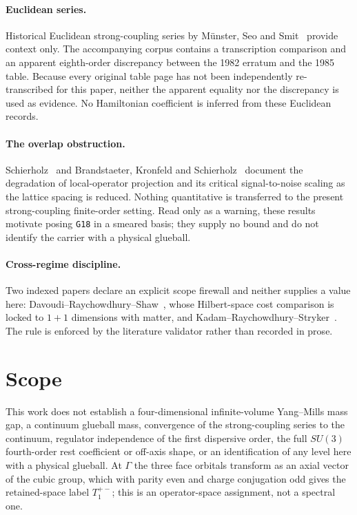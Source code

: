 \documentclass[11pt]{article}
\theoremstyle{plain}
\theoremstyle{definition}
\theoremstyle{remark}
\newcommand{\chk}[1]{}
\begin{document}
\paragraph{Euclidean series.} Historical Euclidean strong-coupling series by
M\"unster, Seo and Smit~\cite{Munster1981,Seo1982,Smit1982,Munster1983,Munster1985}
provide context only. The accompanying corpus contains a transcription
comparison and an apparent eighth-order discrepancy between the 1982 erratum
and the 1985 table. Because every original table page has not been
independently re-transcribed for this paper, neither the apparent equality nor
the discrepancy is used as evidence. No Hamiltonian coefficient is inferred
from these Euclidean records.
\chk{the errata-resolved Euclidean series is doubly sourced, transcription for transcription}
\chk{FINDING: Munster's 1985 table shifts his 1982 erratum at eighth order}

\paragraph{The overlap obstruction.} Schierholz~\cite{Schierholz1988} and
Brandstaeter, Kronfeld and Schierholz~\cite{BKS1990} document the degradation
of local-operator projection and its critical signal-to-noise scaling as the
lattice spacing is reduced. Nothing quantitative is transferred to the
present strong-coupling finite-order setting. Read only as a warning, these
results motivate posing \texttt{G18} in a smeared basis; they supply no bound
and do not identify the carrier with a physical glueball.
\chk{the overlap obstruction was published in 1988, and it scales}

\paragraph{Cross-regime discipline.} Two indexed papers declare an explicit
scope firewall and neither supplies a value here:
Davoudi--Raychowdhury--Shaw~\cite{DRS2021}, whose Hilbert-space cost comparison
is locked to $1{+}1$ dimensions with matter, and
Kadam--Raychowdhury--Stryker~\cite{KRS2023}. The rule is enforced by the
literature validator rather than recorded in prose.
\chk{a cross-regime paper never supplies a value}

\section{Scope}
\label{sec:scope}

This work does not establish a four-dimensional infinite-volume Yang--Mills
mass gap, a continuum glueball mass, convergence of the strong-coupling series
to the continuum, regulator independence of the first dispersive order, the
full $SU(3)$ fourth-order rest coefficient or off-axis shape, or an
identification of any level here with a physical glueball. At $\Gamma$ the
three face orbitals transform as an axial vector of the cubic group, which
with parity even and charge conjugation odd gives the retained-space label
$T_1^{+-}$; this is an operator-space assignment, not a spectral one.
\end{document}
